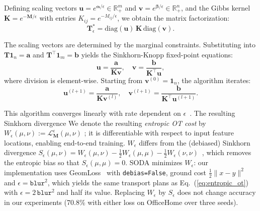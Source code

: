 \documentclass[preprint,12pt]{elsarticle}
\providecommand{\DIFadd}[1]{{\protect\color{blue} \sf #1}} %
\providecommand{\DIFdel}[1]{{\protect\color{red} \scriptsize #1}} %
\providecommand{\DIFaddbegin}{} %
\providecommand{\DIFaddend}{} %
\providecommand{\DIFdelbegin}{} %
\providecommand{\DIFdelend}{} %
\newcommand{\DIFscaledelfig}{0.5}
\newlength{\DIFdelgraphicswidth} %
\newlength{\DIFdelgraphicsheight} %
\newcommand{\DIFaddincludegraphics}[2][]{{\color{blue}\fbox{\DIFOincludegraphics[#1]{#2}}}} %
\newcommand{\DIFdelincludegraphics}[2][]{%
\sbox{\DIFdelgraphicsbox}{\DIFOincludegraphics[#1]{#2}}%
\settoboxwidth{\DIFdelgraphicswidth}{\DIFdelgraphicsbox} %
\settoboxtotalheight{\DIFdelgraphicsheight}{\DIFdelgraphicsbox} %
\scalebox{\DIFscaledelfig}{%
\parbox[b]{\DIFdelgraphicswidth}{\usebox{\DIFdelgraphicsbox}\\[-\baselineskip] \rule{\DIFdelgraphicswidth}{0em}}\llap{\resizebox{\DIFdelgraphicswidth}{\DIFdelgraphicsheight}{%
\setlength{\unitlength}{\DIFdelgraphicswidth}%
\begin{picture}(1,1)%
\thicklines\linethickness{2pt} %
{\color[rgb]{1,0,0}\put(0,0){\framebox(1,1){}}}%
{\color[rgb]{1,0,0}\put(0,0){\line( 1,1){1}}}%
{\color[rgb]{1,0,0}\put(0,1){\line(1,-1){1}}}%
\end{picture}%
}\hspace*{3pt}}} %
} %
\DeclareRobustCommand{\DIFaddbegin}{\DIFOaddbegin \let\includegraphics\DIFaddincludegraphics} %
\DeclareRobustCommand{\DIFaddend}{\DIFOaddend \let\includegraphics\DIFOincludegraphics} %
\DeclareRobustCommand{\DIFdelbegin}{\DIFOdelbegin \let\includegraphics\DIFdelincludegraphics} %
\DeclareRobustCommand{\DIFdelend}{\DIFOaddend \let\includegraphics\DIFOincludegraphics} %
\begin{document}
Defining scaling vectors $\mathbf{u} = e^{\boldsymbol{\alpha}/\epsilon} \in \mathbb{R}^m_+$ and $\mathbf{v} = e^{\boldsymbol{\beta}/\epsilon} \in \mathbb{R}^n_+$, and the Gibbs kernel $\mathbf{K} = e^{-\mathbf{M}/\epsilon}$ with entries $K_{ij} = e^{-M_{ij}/\epsilon}$, we obtain the matrix factorization:
\begin{equation}
    \mathbf{T}^*_\epsilon = \text{diag}(\mathbf{u}) \, \mathbf{K} \, \text{diag}(\mathbf{v}).
\end{equation}

The scaling vectors are determined by the marginal constraints. Substituting into $\mathbf{T}\mathbf{1}_n = \mathbf{a}$ and $\mathbf{T}^\top\mathbf{1}_m = \mathbf{b}$ yields the Sinkhorn-Knopp fixed-point equations:
\begin{equation}
    \mathbf{u} = \frac{\mathbf{a}}{\mathbf{K}\mathbf{v}}, \quad \mathbf{v} = \frac{\mathbf{b}}{\mathbf{K}^\top\mathbf{u}},
\end{equation}
where division is element-wise. Starting from $\mathbf{v}^{(0)} = \mathbf{1}_n$, the algorithm iterates:
\begin{equation}
    \mathbf{u}^{(l+1)} = \frac{\mathbf{a}}{\mathbf{K}\mathbf{v}^{(l)}}, \quad \mathbf{v}^{(l+1)} = \frac{\mathbf{b}}{\mathbf{K}^\top\mathbf{u}^{(l+1)}}.
\end{equation}

This algorithm converges linearly with rate dependent on $\epsilon$~\citep{peyre2019computational}. \DIFdelbegin \DIFdel{The resulting Sinkhorn divergence }\DIFdelend \DIFaddbegin \DIFadd{We denote the resulting \emph{entropic OT cost} by }\DIFaddend $W_\epsilon(\mu, \nu) := \mathcal{L}^\epsilon_{\mathbf{M}}(\mu, \nu)$\DIFaddbegin \DIFadd{; it }\DIFaddend is differentiable with respect to input feature locations, enabling end-to-end training. \DIFaddbegin \DIFadd{$W_\epsilon$ differs from the (debiased) Sinkhorn divergence $S_\epsilon(\mu,\nu)=W_\epsilon(\mu,\nu)-\tfrac12W_\epsilon(\mu,\mu)-\tfrac12W_\epsilon(\nu,\nu)$~\citep{feydy2019interpolating}, which removes the entropic bias so that $S_\epsilon(\mu,\mu)=0$. SODA minimizes $W_\epsilon$: our implementation uses GeomLoss~\citep{feydy2019interpolating} with \texttt{debias=False}, ground cost $\tfrac12\|x-y\|^2$ and $\epsilon=\texttt{blur}^2$, which yields the same transport plans as Eq.~(\ref{eq:entropic_ot}) with $\epsilon=2\,\texttt{blur}^2$ and half its value. Replacing $W_\epsilon$ by $S_\epsilon$ does not change accuracy in our experiments (70.8\% with either loss on OfficeHome over three seeds).
}\DIFaddend 
\end{document}
